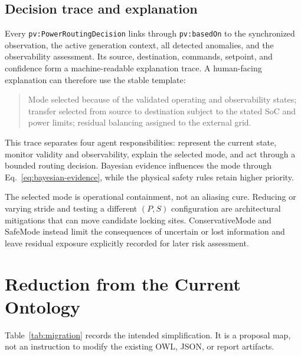 \documentclass[
	letterpaper,
	10pt,
	unnumberedsections,
	twoside,
]{LTJournalArticle}
\newcommand{\pv}[1]{\texttt{pv:#1}}
\newcommand{\valueof}[1]{\textsf{#1}}
\begin{document}
\subsection{Decision trace and explanation}

Every \pv{PowerRoutingDecision} links through \pv{basedOn} to the synchronized observation, the active generation context, all detected anomalies, and the observability assessment. Its source, destination, commands, setpoint, and confidence form a machine-readable explanation trace. A human-facing explanation can therefore use the stable template:
\begin{quote}
Mode selected because of the validated operating and observability states; transfer selected from source to destination subject to the stated SoC and power limits; residual balancing assigned to the external grid.
\end{quote}
This trace separates four agent responsibilities: represent the current state, monitor validity and observability, explain the selected mode, and act through a bounded routing decision. Bayesian evidence influences the mode through Eq.~\eqref{eq:bayesian-evidence}, while the physical safety rules retain higher priority.

The selected mode is operational containment, not an aliasing cure. Reducing or varying stride and testing a different $(P,S)$ configuration are architectural mitigations that can move candidate locking sites. \valueof{ConservativeMode} and \valueof{SafeMode} instead limit the consequences of uncertain or lost information and leave residual exposure explicitly recorded for later risk assessment.

\section{Reduction from the Current Ontology}

Table~\ref{tab:migration} records the intended simplification. It is a proposal map, not an instruction to modify the existing OWL, JSON, or report artifacts.
\end{document}
